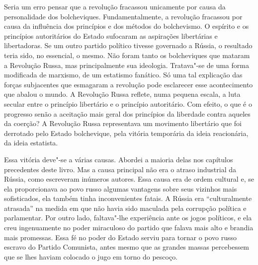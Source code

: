 Seria um erro pensar que a revolução fracassou unicamente por causa da
personalidade dos bolcheviques. Fundamentalmente, a revolução fracassou
por causa da influência dos princípios e dos métodos do bolchevismo. O
espírito e os princípios autoritários do Estado sufocaram as aspirações
libertárias e libertadoras. Se um outro partido político tivesse
governado a Rússia, o resultado teria sido, no essencial, o mesmo. Não
foram tanto os bolcheviques que mataram a Revolução Russa, mas
principalmente sua ideologia. Tratava"-se de uma forma modificada de
marxismo, de um estatismo fanático. Só uma tal explicação das forças
subjacentes que esmagaram a revolução pode esclarecer esse
acontecimento que abalou o mundo. A Revolução Russa reflete, numa
pequena escala, a luta secular entre o princípio libertário e o
princípio autoritário. Com efeito, o que é o progresso senão a
aceitação mais geral dos princípios da liberdade contra aqueles da
coerção? A Revolução Russa representava um movimento libertário que foi
derrotado pelo Estado bolchevique, pela vitória temporária da ideia
reacionária, da ideia estatista.

Essa vitória deve"-se a várias causas. Abordei a maioria delas nos
capítulos precedentes deste livro. Mas a causa principal não era o
atraso industrial da Rússia, como escreveram inúmeros autores. Essa
causa era de ordem cultural e, se ela proporcionava ao povo russo
algumas vantagens sobre seus vizinhos mais sofisticados, ela também
tinha inconvenientes fatais. A Rússia era “culturalmente atrasada” na
medida em que não havia sido maculada pela corrupção política e
parlamentar. Por outro lado, faltava"-lhe experiência ante os jogos
políticos, e ela creu ingenuamente no poder miraculoso do partido que
falava mais alto e brandia mais promessas. Essa fé no poder do Estado
serviu para tornar o povo russo escravo do Partido Comunista, antes
mesmo que as grandes massas percebessem que se lhes haviam colocado o
jugo em torno do pescoço.

